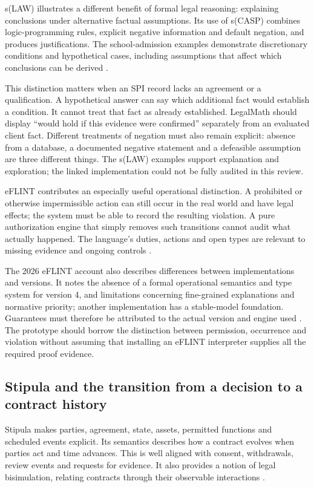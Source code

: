 s(LAW) illustrates a different benefit of formal legal reasoning: explaining
conclusions under alternative factual assumptions. Its use of s(CASP) combines
logic-programming rules, explicit negative information and default negation, and
produces justifications. The school-admission examples demonstrate discretionary
conditions and hypothetical cases, including assumptions that affect which
conclusions can be derived \citep[secs.~4--5]{slaw2024}.

This distinction matters when an SPI record lacks an agreement or a qualification.
A hypothetical answer can say which additional fact would establish a condition.
It cannot treat that fact as already established. LegalMath should display
``would hold if this evidence were confirmed'' separately from an evaluated
client fact. Different treatments of negation must also remain explicit: absence
from a database, a documented negative statement and a defeasible assumption are
three different things. The s(LAW) examples support explanation and exploration;
the linked implementation could not be fully audited in this review.

eFLINT contributes an especially useful operational distinction. A prohibited or
otherwise impermissible action can still occur in the real world and have legal
effects; the system must be able to record the resulting violation. A pure
authorization engine that simply removes such transitions cannot audit what
actually happened. The language's duties, actions and open types are relevant
to missing evidence and ongoing controls \citep[secs.~3--5]{eflint2026}.

The 2026 eFLINT account also describes differences between implementations and
versions. It notes the absence of a formal operational semantics and type system
for version 4, and limitations concerning fine-grained explanations and normative
priority; another implementation has a stable-model foundation. Guarantees must
therefore be attributed to the actual version and engine used
\citep[secs.~6--7]{eflint2026}. The prototype should borrow the distinction between
permission, occurrence and violation without assuming that installing an eFLINT
interpreter supplies all the required proof evidence.

\subsection{Stipula and the transition from a decision to a contract history}

Stipula makes parties, agreement, state, assets, permitted functions and scheduled
events explicit. Its semantics describes how a contract evolves when parties act
and time advances. This is well aligned with consent, withdrawals, review events
and requests for evidence. It also provides a notion of legal bisimulation,
relating contracts through their observable interactions
\citep[secs.~3--5]{stipula2021}.


